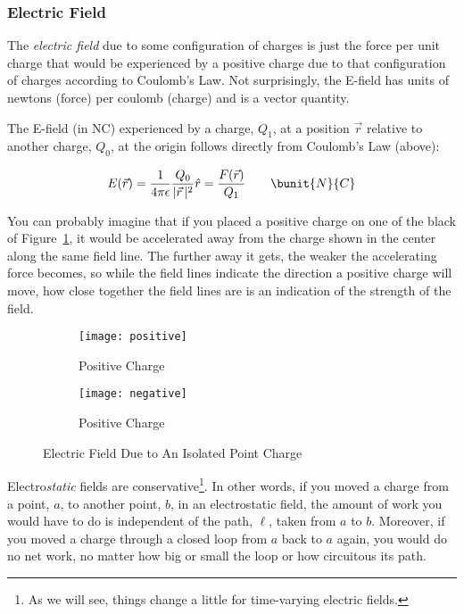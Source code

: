 \subsubsection{Electric Field}

The \emph{electric field} due to some configuration of charges is just
the force per unit charge that would be experienced by a positive
charge due to that configuration of charges according to Coulomb's
Law. Not surprisingly, the E-field has units of newtons (force) per
coulomb (charge) and is a vector quantity.

The E-field (in \unit{N}{C}) experienced by a charge, $Q_1$, at a
position $\vec{r}$ relative to another charge, $Q_0$, at the origin
follows directly from Coulomb's Law (above):

\begin{equation}
\label{eqn:efield}
E(\vec{r}) = \frac{1}{4\pi\epsilon}\frac{Q_0}{|\vec{r}\,|^2} \hat{r} = \frac{F(\vec{r})}{Q_1} \qquad\bunit{N}{C}
\end{equation}

You can probably imagine that if you placed a positive charge on one
of the black  of Figure~\ref{fig:positive}, it
would be accelerated away from the charge shown in the center along
the same field line. The further away it gets, the weaker the
accelerating force becomes, so while the field lines indicate the
direction a positive charge will move, how close together the field
lines are is an indication of the strength of the field.

\begin{figure}[H]
  \centering
  \begin{subfigure}[b]{\twowide}
    \texttt{[image: positive]}
    \caption{Positive Charge}
    \label{fig:positive}
  \end{subfigure}
  \begin{subfigure}[b]{\twowide}
    \texttt{[image: negative]}
    \caption{Positive Charge}
    \label{fig:negative}
  \end{subfigure}
  \caption{Electric Field Due to An Isolated Point Charge}
  \label{fig:onecharge}
\end{figure}

Electro\emph{static} fields are conservative\footnote{As we will see,
  things change a little for time-varying electric fields.}. In other
words, if you moved a charge from a point, $a$, to another point, $b$,
in an electrostatic field, the amount of work you would have to do is
independent of the path, $\ell$, taken from $a$ to $b$. Moreover, if
you moved a charge through a closed loop from $a$ back to $a$ again,
you would do no net work, no matter how big or small the loop or how
circuitous its path.

